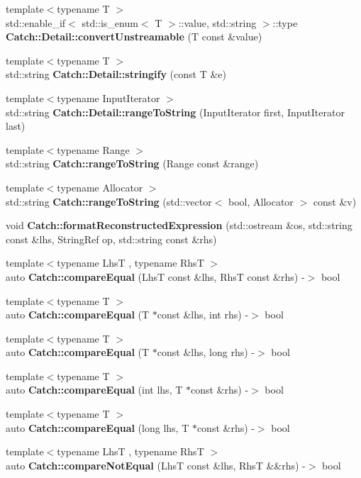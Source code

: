 \begin{DoxyCompactItemize}
\item 
{\footnotesize template$<$typename T $>$ }\\std\+::enable\+\_\+if$<$ std\+::is\+\_\+enum$<$ T $>$\+::value, std\+::string $>$\+::type \textbf{ Catch\+::\+Detail\+::convert\+Unstreamable} (T const \&value)
\item 
{\footnotesize template$<$typename T $>$ }\\std\+::string \textbf{ Catch\+::\+Detail\+::stringify} (const T \&e)
\item 
{\footnotesize template$<$typename Input\+Iterator $>$ }\\std\+::string \textbf{ Catch\+::\+Detail\+::range\+To\+String} (Input\+Iterator first, Input\+Iterator last)
\item 
{\footnotesize template$<$typename Range $>$ }\\std\+::string \textbf{ Catch\+::range\+To\+String} (Range const \&range)
\item 
{\footnotesize template$<$typename Allocator $>$ }\\std\+::string \textbf{ Catch\+::range\+To\+String} (std\+::vector$<$ bool, Allocator $>$ const \&v)
\item 
void \textbf{ Catch\+::format\+Reconstructed\+Expression} (std\+::ostream \&os, std\+::string const \&lhs, String\+Ref op, std\+::string const \&rhs)
\item 
{\footnotesize template$<$typename LhsT , typename RhsT $>$ }\\auto \textbf{ Catch\+::compare\+Equal} (LhsT const \&lhs, RhsT const \&rhs) -\/$>$ bool
\item 
{\footnotesize template$<$typename T $>$ }\\auto \textbf{ Catch\+::compare\+Equal} (T $\ast$const \&lhs, int rhs) -\/$>$ bool
\item 
{\footnotesize template$<$typename T $>$ }\\auto \textbf{ Catch\+::compare\+Equal} (T $\ast$const \&lhs, long rhs) -\/$>$ bool
\item 
{\footnotesize template$<$typename T $>$ }\\auto \textbf{ Catch\+::compare\+Equal} (int lhs, T $\ast$const \&rhs) -\/$>$ bool
\item 
{\footnotesize template$<$typename T $>$ }\\auto \textbf{ Catch\+::compare\+Equal} (long lhs, T $\ast$const \&rhs) -\/$>$ bool
\item 
{\footnotesize template$<$typename LhsT , typename RhsT $>$ }\\auto \textbf{ Catch\+::compare\+Not\+Equal} (LhsT const \&lhs, RhsT \&\&rhs) -\/$>$ bool

\end{DoxyCompactItemize}

